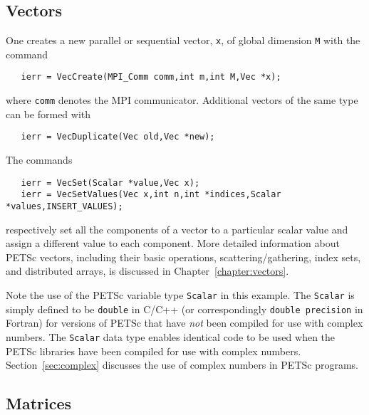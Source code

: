 \subsection*{Vectors}

One creates a new parallel or 
sequential vector, {\tt x}, of global dimension {\tt M} with the 
command  
\begin{verbatim}
   ierr = VecCreate(MPI_Comm comm,int m,int M,Vec *x);
\end{verbatim}
where {\tt comm} denotes the MPI communicator.
Additional vectors of the same type can be formed with
\begin{verbatim}
   ierr = VecDuplicate(Vec old,Vec *new);
\end{verbatim}
The commands  
\begin{verbatim}
   ierr = VecSet(Scalar *value,Vec x);
   ierr = VecSetValues(Vec x,int n,int *indices,Scalar *values,INSERT_VALUES);
\end{verbatim}
respectively set all the components of a vector to a particular scalar
value and assign a different value to each component.  More
detailed information about PETSc vectors, including their basic
operations, scattering/gathering, index sets, and distributed arrays, is
discussed in Chapter~\ref{chapter:vectors}.

 
Note the use of the PETSc variable type {\tt Scalar} in this example.
The {\tt Scalar} is simply defined to be {\tt double} in C/C++
(or correspondingly {\tt double precision} in Fortran) for versions of
PETSc that have {\em not} been compiled for use with complex numbers.
The {\tt Scalar} data type enables
identical code to be used when the PETSc libraries have been compiled
for use with complex numbers.  Section~\ref{sec:complex} discusses the
use of complex numbers in PETSc programs.

\subsection*{Matrices}


